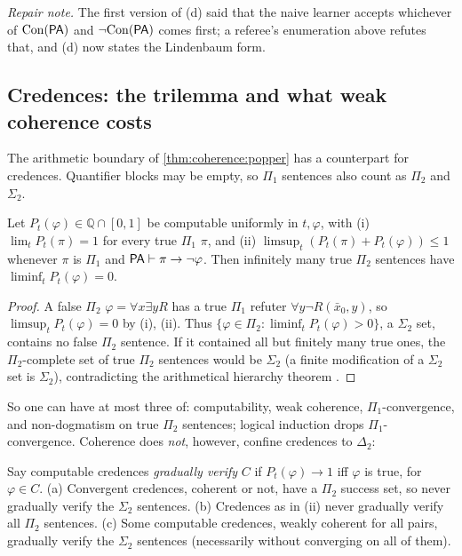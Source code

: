 \emph{Repair note.} The first version of (d) said that the naive learner accepts whichever of $\mathrm{Con}(\mathsf{PA})$ and $\neg\mathrm{Con}(\mathsf{PA})$ comes first; a referee's enumeration above refutes that, and (d) now states the Lindenbaum form.

\subsection{Credences: the trilemma and what weak coherence costs}\label{app:coherence:costs}

The arithmetic boundary of \cref{thm:coherence:popper} has a counterpart for credences. Quantifier blocks may be empty, so $\Pi_1$ sentences also count as $\Pi_2$ and $\Sigma_2$.

\begin{theorem}\label{thm:coherence:trilemma}
Let $P_t(\varphi)\in\mathbb Q\cap[0,1]$ be computable uniformly in $t,\varphi$, with \textup{(i)} $\lim_tP_t(\pi)=1$ for every true $\Pi_1$ $\pi$, and \textup{(ii)} $\limsup_t(P_t(\pi)+P_t(\varphi))\le1$ whenever $\pi$ is $\Pi_1$ and $\mathsf{PA}\vdash\pi\to\neg\varphi$. Then infinitely many true $\Pi_2$ sentences have $\liminf_tP_t(\varphi)=0$.
\end{theorem}

\begin{proof}
A false $\Pi_2$ $\varphi=\forall x\exists y R$ has a true $\Pi_1$ refuter $\forall y\neg R(\bar x_0,y)$, so $\limsup_tP_t(\varphi)=0$ by (i), (ii). Thus $\{\varphi\in\Pi_2:\liminf_tP_t(\varphi)>0\}$, a $\Sigma_2$ set, contains no false $\Pi_2$ sentence. If it contained all but finitely many true ones, the $\Pi_2$-complete set of true $\Pi_2$ sentences would be $\Sigma_2$ (a finite modification of a $\Sigma_2$ set is $\Sigma_2$), contradicting the arithmetical hierarchy theorem \citep[\S57]{kleene1952introduction}.
\end{proof}

So one can have at most three of: computability, weak coherence, $\Pi_1$-convergence, and non-dogmatism on true $\Pi_2$ sentences; logical induction drops $\Pi_1$-convergence. Coherence does \emph{not}, however, confine credences to $\Delta_2$:

\begin{proposition}\label{prop:coherence:costs}
Say computable credences \emph{gradually verify} $C$ if $P_t(\varphi)\to1$ iff $\varphi$ is true, for $\varphi\in C$. \textup{(a)} Convergent credences, coherent or not, have a $\Pi_2$ success set, so never gradually verify the $\Sigma_2$ sentences. \textup{(b)} Credences as in (ii) never gradually verify all $\Pi_2$ sentences. \textup{(c)} Some computable credences, weakly coherent for all pairs, gradually verify the $\Sigma_2$ sentences (necessarily without converging on all of them).
\end{proposition}

